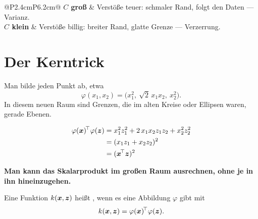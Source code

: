 \begin{merksatz}
\begin{center}
{\small
\renewcommand{\arraystretch}{1.5}
\begin{tabular}{@{}P{2.4cm}P{6.2cm}@{}}
\toprule
\textbf{$C$ groß} & Verstöße teuer: schmaler Rand, folgt den Daten --- Varianz.\\
\textbf{$C$ klein} & Verstöße billig: breiter Rand, glatte Grenze --- Verzerrung.\\
\bottomrule
\end{tabular}}
\end{center}

\end{merksatz}

\section{Der Kerntrick}

\begin{merksatz}
Man bilde jeden Punkt ab, etwa
\[ \varphi(x_1, x_2) = \bigl(x_1^{2},\ \sqrt2\,x_1x_2,\ x_2^{2}\bigr) . \]
In diesem neuen Raum sind Grenzen, die im alten Kreise oder Ellipsen waren, gerade Ebenen.

\begin{align*}
\varphi(\boldsymbol{x})^{\!\top}\varphi(\boldsymbol{z}) &= x_1^{2}z_1^{2} + 2\,x_1x_2z_1z_2 + x_2^{2}z_2^{2}\\
&= (x_1z_1 + x_2z_2)^{2}\\
&= (\boldsymbol{x}^{\!\top}\boldsymbol{z})^{2}
\end{align*}

\begin{center}
\begin{minipage}{0.9\textwidth}
\textbf{Man kann das Skalarprodukt im großen Raum ausrechnen, ohne je in ihn hineinzugehen.}
\end{minipage}
\end{center}
\end{merksatz}

\begin{definition}
Eine Funktion $k(\boldsymbol{x},\boldsymbol{z})$ heißt , wenn es eine Abbildung $\varphi$ gibt mit
\[ k(\boldsymbol{x},\boldsymbol{z}) = \varphi(\boldsymbol{x})^{\!\top}\varphi(\boldsymbol{z}) . \]
\end{definition}

